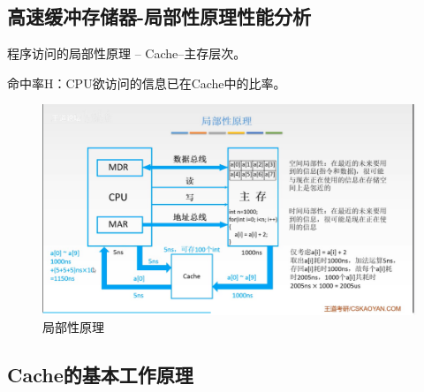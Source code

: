 \documentclass[12pt]{ctexart}
\begin{document}
\subsection{高速缓冲存储器-局部性原理性能分析}
程序访问的局部性原理 -- Cache--主存层次。

命中率H：CPU欲访问的信息已在Cache中的比率。

\begin{figure}[htbp]
    \centering
    \includegraphics[scale=0.6]{局部性原理.png}
    \caption{局部性原理}
    \end{figure}
\subsection{Cache的基本工作原理}
\end{document}
